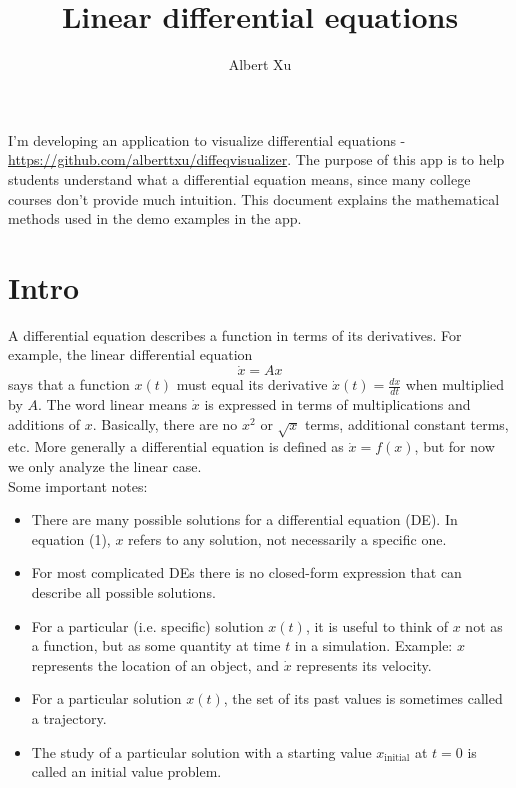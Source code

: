 \documentclass[11pt, oneside]{article}   	%
\title{Linear differential equations}
\author{Albert Xu}
\begin{document}
\maketitle

I'm developing an application to visualize differential equations - \url{https://github.com/alberttxu/diffeqvisualizer}.
The purpose of this app is to help students understand what a differential equation means,
since many college courses don't provide much intuition.
This document explains the mathematical methods used in the demo examples in the app.

\section{Intro}

A differential equation describes a function in terms of its derivatives.
For example, the linear differential equation
\begin{equation}
\dot{x} = Ax
\end{equation}
says that a function $x(t)$ must equal its derivative $\dot{x}(t) = \frac{dx}{dt}$ when multiplied by $A$.
The word linear means $\dot{x}$ is expressed in terms of multiplications and additions of $x$.
Basically, there are no $x^2$ or $\sqrt{x}$ terms, additional constant terms, etc.
More generally a differential equation is defined as $\dot{x} = f(x)$,
but for now we only analyze the linear case.  \\

\noindent
Some important notes:
\begin{itemize}
  \item There are many possible solutions for a differential equation (DE).
  In equation (1), $x$ refers to any solution, not necessarily a specific one.
  \item For most complicated DEs there is no closed-form expression that can describe all possible solutions.
  \item For a particular (i.e. specific) solution $x(t)$, it is useful to think of $x$ not as a function, but as some quantity at time $t$ in a simulation.
    \subitem Example: $x$ represents the location of an object, and $\dot{x}$ represents its velocity.
  \item For a particular solution $x(t)$, the set of its past values is sometimes called a trajectory.
  \item The study of a particular solution with a starting value $x_\mathrm{initial}$ at $t = 0$ is called an initial value problem.
\end{itemize}
\end{document}
